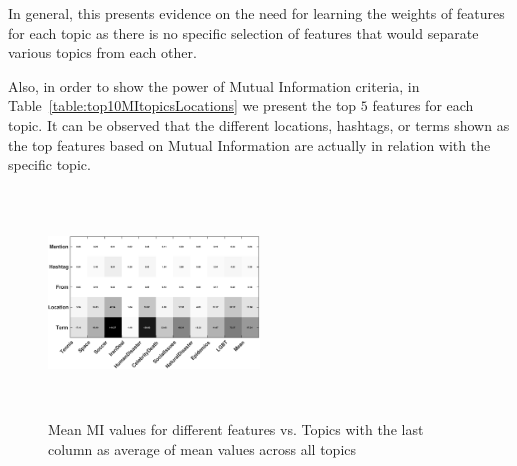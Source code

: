 In general, this presents evidence on the need for learning the weights of features for each topic as there is no specific selection of features that would separate various topics from each other.

Also, in order to show the power of Mutual Information criteria, in Table~\ref{table:top10MItopicsLocations} we present the top $5$ features for each topic. It can be observed that the different locations, hashtags, or terms shown as the top features based on Mutual Information are actually in relation with the specific topic.

\begin{figure}[h!]
\centering
\includegraphics[width=0.5\textwidth, height=60mm]{images/avgMI_gray.pdf}
\vspace{-3mm}
\caption{Mean MI values for different features vs. Topics with the last column as average of mean values across all topics}
\label{fig:avgMI}
\end{figure}

